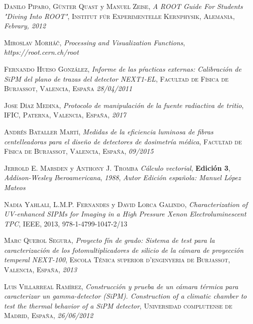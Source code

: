 \begin{thebibliography}{99}
 \textsc{Danilo Piparo}, \textsc{Günter Quast} y \textsc{Manuel Zeise},
\textit{A ROOT Guide For Students "Diving Into ROOT"}, \textsc{Institut für Experimentelle Kernphysik, Alemania}, \textit{Febrary, 2012}

 \textsc{Miroslav Morháč},
\textit{Processing and Visualization Functions}, \textit{https://root.cern.ch/root}

 \textsc{Fernando Hueso González},
\textit{Informe de las pŕacticas externas: Calibración de SiPM del plano de trazas del detector NEXT1-EL}, \textsc{Facultad de Física de Burjassot, Valencia, España} \textit{28/04/2011}

 \textsc{Jose Díaz Medina},
\textit{Protocolo de manipulación de la fuente radiactiva de tritio}, \textsc{IFIC, Paterna, Valencia, España}, \textit{2017}

 \textsc{Andrés Bataller Martí},
\textit{Medidas de la eficiencia luminosa de fibras centelleadoras para el diseño de detectores de dosimetría médica}, \textsc{Facultad de Física de Burjassot, Valencia, España}, \textit{09/2015}

 \textsc{Jerrold E. Marsden} y \textsc{Anthony J. Tromba}
\textit{Cálculo vectorial}, \textbf{Edición 3}, \textit{Addison-Wesley Iberoamericana}, \textit{1988}, \textit{Autor Edición española: Manuel López Mateos}

 \textsc{Nadia Yahlali}, \textsc{L.M.P. Fernandes} y \textsc{David Lorca Galindo},
\textit{Characterization of UV-enhanced SIPMs for Imaging in a High Pressure Xenon Electroluminescent TPC}, \textsc{IEEE}, \textsc{2013}, \textsc{978-1-4799-1047-2/13}

 \textsc{Marc Querol Segura},
\textit{Proyecto fín de grado: Sistema de test para la caracterización de los fotomultiplicadores de silicio de la cámara de proyección temperal NEXT-100}, \textsc{Escola Ténica superior d'enginyeria de Burjassot, Valencia, España}, \textit{2013}

 \textsc{Luis Villarreal Ramírez},
\textit{Construcción y prueba de un cámara térmica para caracterizar un gamma-detector (SiPM). Construction of a climatic chamber to test the thermal behavior of a SiPM detector}, \textsc{Universidad complutense de Madrid, España}, \textit{26/06/2012}
 
\end{thebibliography}